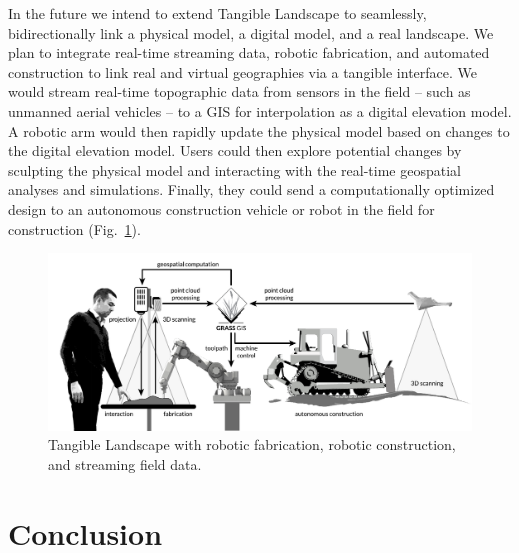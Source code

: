 \documentclass[prodmode,acmtochi]{acmsmall} %
\begin{document}
In the future we intend to extend Tangible Landscape to 
seamlessly, bidirectionally link 
a physical model, a digital model, and a real landscape.
%
We plan to integrate real-time streaming data, 
robotic fabrication, 
and automated construction 
to link real and virtual geographies via a tangible interface. 
%
We would stream real-time topographic data 
from sensors in the field -- such as unmanned aerial vehicles --
to a GIS for interpolation as a digital elevation model. 
%
A robotic arm would then rapidly update the physical model 
based on changes to the digital elevation model. 
%
Users could then explore potential changes by sculpting the physical model
and interacting with the real-time geospatial analyses and simulations. 
Finally, they could send a computationally optimized design 
to an autonomous construction vehicle or robot in the field for construction 
(Fig.~\ref{fig:system_schema_land}). 

\begin{figure}
\begin{center}
\includegraphics[width=\textwidth]{images/system_schema_land.pdf}
\caption{Tangible Landscape with 
robotic fabrication, robotic construction, and streaming field data.}
\label{fig:system_schema_land}
\end{center}
\end{figure}

\section{Conclusion}

% 
%

\end{document}
